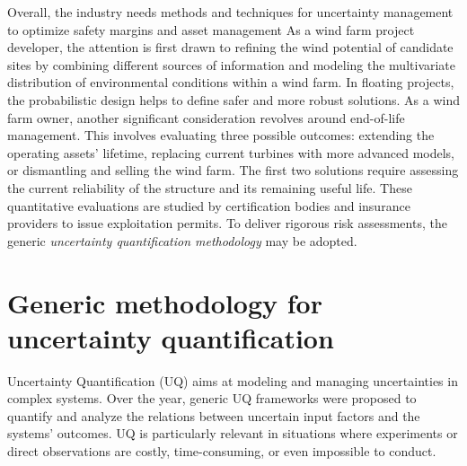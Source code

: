 
Overall, the industry needs methods and techniques for uncertainty management to optimize safety margins and asset management
As a wind farm project developer, the attention is first drawn to refining the wind potential of candidate sites by combining different sources of information and 
modeling the multivariate distribution of environmental conditions within a wind farm. 
In floating projects, the probabilistic design helps to define safer and more robust solutions. 
As a wind farm owner, another significant consideration revolves around end-of-life management. 
This involves evaluating three possible outcomes: extending the operating assets' lifetime, replacing current turbines with more advanced models, or dismantling and selling the wind farm. 
The first two solutions require assessing the current reliability of the structure and its remaining useful life. 
These quantitative evaluations are studied by certification bodies and insurance providers to issue exploitation permits.
To deliver rigorous risk assessments, the generic \textit{uncertainty quantification methodology} may be adopted.

\section*{Generic methodology for uncertainty quantification}

Uncertainty Quantification (\acrshort{UQ}) aims at modeling and managing uncertainties in complex systems.
Over the year, generic UQ frameworks were proposed  to quantify and analyze the relations between uncertain input factors and the systems' outcomes. 
UQ is particularly relevant in situations where experiments or direct observations are costly, time-consuming, or even impossible to conduct.

